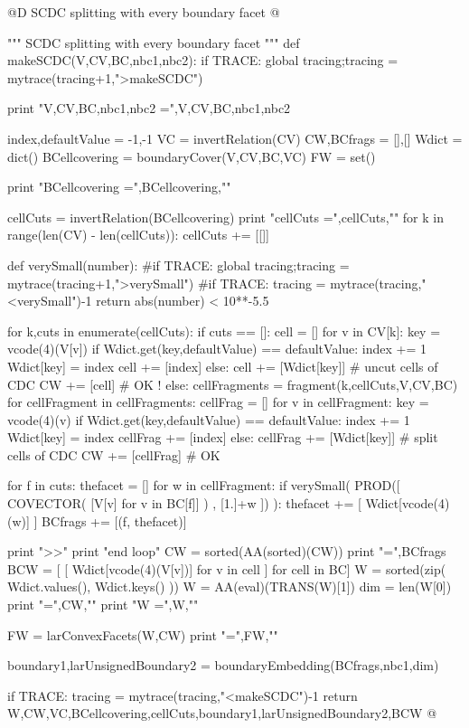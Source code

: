 \documentclass[11pt,oneside]{article}	%
\begin{document}
@D SCDC splitting with every boundary facet
@{""" SCDC splitting with every boundary facet """
def makeSCDC(V,CV,BC,nbc1,nbc2):
	if TRACE: global tracing;tracing = mytrace(tracing+1,">makeSCDC")

	print "V,CV,BC,nbc1,nbc2 =",V,CV,BC,nbc1,nbc2
		
	index,defaultValue = -1,-1
	VC = invertRelation(CV)
	CW,BCfrags = [],[]
	Wdict = dict()
	BCellcovering = boundaryCover(V,CV,BC,VC)
	FW = set()
	
	print "BCellcovering =",BCellcovering,"\n"

	cellCuts = invertRelation(BCellcovering)
	print "cellCuts =",cellCuts,"\n"
	for k in range(len(CV) - len(cellCuts)): cellCuts += [[]]

	def verySmall(number): 
		#if TRACE: global tracing;tracing = mytrace(tracing+1,">verySmall")		
		#if TRACE: tracing = mytrace(tracing,"<verySmall")-1
		return abs(number) < 10**-5.5
	
	for k,cuts in enumerate(cellCuts):
		if cuts == []:
			cell = []
			for v in CV[k]:
				key = vcode(4)(V[v])
				if Wdict.get(key,defaultValue) == defaultValue:
					index += 1
					Wdict[key] = index
					cell += [index]
				else: 
					cell += [Wdict[key]]
			# uncut cells of CDC
			CW += [cell]  # OK !
		else:
			cellFragments = fragment(k,cellCuts,V,CV,BC)
			for cellFragment in cellFragments:
				cellFrag = []
				for v in cellFragment:
					key = vcode(4)(v)
					if Wdict.get(key,defaultValue) == defaultValue:
						index += 1
						Wdict[key] = index
						cellFrag += [index]
					else: 
						cellFrag += [Wdict[key]]
				# split cells of CDC
				CW += [cellFrag]	  # OK

				for f in cuts:
					thefacet = []
					for w in cellFragment:
						if verySmall( PROD([ COVECTOR( [V[v] for v in BC[f]] ) , [1.]+w ]) ):
							thefacet += [ Wdict[vcode(4)(w)] ]
					BCfrags += [(f, thefacet)]		
				
	print "\nmakeSCDC >>"
	print "end loop"
	CW = sorted(AA(sorted)(CW))
	print "\nBCfrags =",BCfrags
	BCW = [ [ Wdict[vcode(4)(V[v])] for v in cell ] for cell in BC]
	W = sorted(zip( Wdict.values(), Wdict.keys() ))
	W = AA(eval)(TRANS(W)[1])
	dim = len(W[0])
	print "\nCW =",CW,"\n"
	print "W =",W,"\n"
	
	FW = larConvexFacets(W,CW)
	print "\nFW =",FW,"\n"
	
	boundary1,larUnsignedBoundary2 = boundaryEmbedding(BCfrags,nbc1,dim)

	if TRACE: tracing = mytrace(tracing,"<makeSCDC")-1
	return W,CW,VC,BCellcovering,cellCuts,boundary1,larUnsignedBoundary2,BCW
@}
\end{document}
